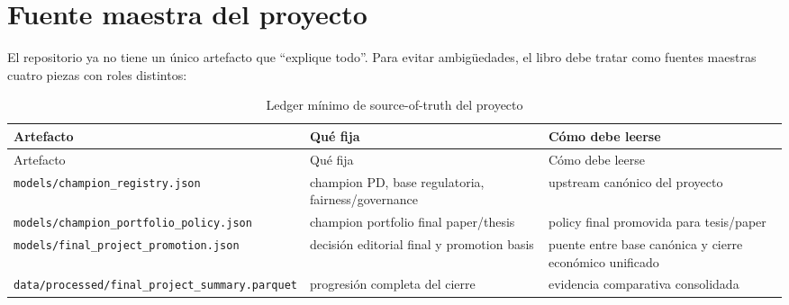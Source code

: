 \documentclass[
  spanish,
  11pt,
  letterpaper,
]{scrbook}
\theoremstyle{plain}
\theoremstyle{remark}
\begin{document}
\section{Fuente maestra del proyecto}\label{fuente-maestra-del-proyecto}

El repositorio ya no tiene un único artefacto que ``explique todo''.
Para evitar ambigüedades, el libro debe tratar como fuentes maestras
cuatro piezas con roles distintos:

\begin{longtable}[]{@{}
  >{\raggedright\arraybackslash}p{}
  >{\raggedright\arraybackslash}p{}
  >{\raggedright\arraybackslash}p{}@{}}
\caption{Ledger mínimo de source-of-truth del
proyecto}\label{tbl-source-of-truth}\tabularnewline
\toprule\noalign{}
\begin{minipage}[b]{\linewidth}\raggedright
Artefacto
\end{minipage} & \begin{minipage}[b]{\linewidth}\raggedright
Qué fija
\end{minipage} & \begin{minipage}[b]{\linewidth}\raggedright
Cómo debe leerse
\end{minipage} \\
\midrule\noalign{}
\endfirsthead
\toprule\noalign{}
\begin{minipage}[b]{\linewidth}\raggedright
Artefacto
\end{minipage} & \begin{minipage}[b]{\linewidth}\raggedright
Qué fija
\end{minipage} & \begin{minipage}[b]{\linewidth}\raggedright
Cómo debe leerse
\end{minipage} \\
\midrule\noalign{}
\endhead
\bottomrule\noalign{}
\endlastfoot
\texttt{models/champion\_registry.json} & champion PD, base regulatoria,
fairness/governance & upstream canónico del proyecto \\
\texttt{models/champion\_portfolio\_policy.json} & champion portfolio
final paper/thesis & policy final promovida para tesis/paper \\
\texttt{models/final\_project\_promotion.json} & decisión editorial
final y promotion basis & puente entre base canónica y cierre económico
unificado \\
\texttt{data/processed/final\_project\_summary.parquet} & progresión
completa del cierre & evidencia comparativa consolidada \\
\end{longtable}
\end{document}
